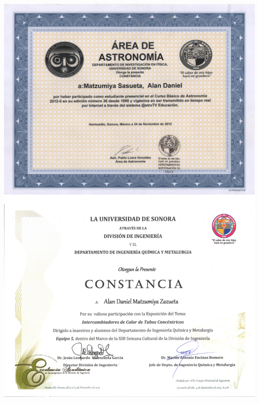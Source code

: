 \colorbox{maya}{
\parbox{1.0\linewidth}{
	\colorbox{white}{
		\parbox{0.98\linewidth}{
			\parbox{0.5\linewidth}{
				\includegraphics[width=1.0\linewidth]{../../docs/astronomy.jpeg}
				}
			\parbox{0.5\linewidth}{
				\includegraphics[width=1.0\linewidth]{../../docs/laboratory.png}
				}
			\parbox{0.5\linewidth}{
}}}}}
